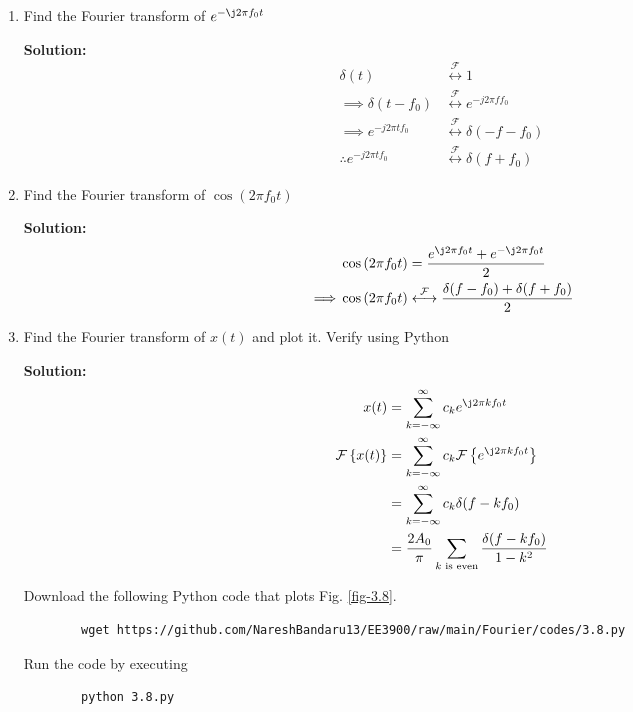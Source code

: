 \documentclass[journal,12pt,twocolumn]{IEEEtran}
\newcommand{\solution}{\noindent \textbf{Solution: }}
\providecommand{\brak}[1]{\ensuremath{\left(#1\right)}}
\providecommand{\cbrak}[1]{\ensuremath{\left\{#1\right\}}}
\providecommand{\der}[1]{\mathrm{d} #1}
\providecommand{\system}[1]{\overset{\mathcal{#1}}{ \longleftrightarrow}}
\numberwithin{equation}{section}
\numberwithin{figure}{section}
\renewcommand\thesection{\arabic{section}}
\begin{document}
\begin{enumerate}[label=\thesection.\arabic*,ref=\thesection.\theenumi]
	\solution 
	\begin{align}
		\delta(t)\system{F} &\int_{-\infty}^{\infty}\delta(t)e^{-j2\pi ft}\,\der{t} \\
		=& \left. e^{-j2\pi ft} \right|_{t=0} \\
		=& 1
	\end{align}
	
	\item Find the Fourier transform of $e^{-\j2\pi f_0 t}$
	
	\solution 
	\begin{align}
		\delta(t) &\system{F} 1 \\
		\implies \delta(t-f_0) &\system{F} e^{-j2\pi ff_0} \\
		\implies e^{-j2\pi tf_0} &\system{F} \delta(-f-f_0) \\
		\therefore e^{-j2\pi tf_0} &\system{F} \delta(f+f_0)
	\end{align}
	
	\item Find the Fourier transform of $\cos\brak{2\pi f_0 t}$
	
	\solution 
	\begin{align}
		&\cos\brak{2\pi f_0 t} = \frac{e^{\j2\pi f_0 t} + e^{-\j2\pi f_0 t}}{2} \\
		\implies &\cos\brak{2\pi f_0 t} \system{F} \frac{\delta(f-f_0) + \delta(f+f_0)}{2}
	\end{align}

	\item Find the Fourier transform of $x(t)$ and plot it. Verify using Python

	\solution 
	\begin{align}
		x(t) &= \sum_{k=-\infty}^\infty c_k e^{\j 2\pi kf_0t} \\
		\mathcal{F}\cbrak{x(t)} &= \sum_{k=-\infty}^\infty c_k \mathcal{F}\cbrak{e^{\j 2\pi kf_0t}} \\
		&= \sum_{k=-\infty}^\infty c_k \delta(f-kf_0) \\
		&= \frac{2A_0}{\pi} \sum_{k \text{ is even}} \frac{\delta(f-kf_0)}{1-k^2}
	\end{align}
	
	Download the following Python code that plots Fig. \ref{fig-3.8}.
	\begin{lstlisting}
		wget https://github.com/NareshBandaru13/EE3900/raw/main/Fourier/codes/3.8.py
	\end{lstlisting}
	
	Run the code by executing
	\begin{lstlisting}
		python 3.8.py
	\end{lstlisting}


\end{enumerate}
\end{document}
